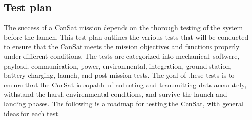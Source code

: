 \documentclass[11pt]{article}
\begin{document}
\subsection{Test plan}

The success of a CanSat mission depends on the thorough testing of the system before the launch. This test plan outlines the various tests that will be conducted to ensure that the CanSat meets the mission objectives and functions properly under different conditions. The tests are categorized into mechanical, software, payload, communication, power, environmental, integration, ground station, battery charging, launch, and post-mission tests. The goal of these tests is to ensure that the CanSat is capable of collecting and transmitting data accurately, withstand the harsh environmental conditions, and survive the launch and landing phases. The following is a roadmap for testing the CanSat, with general ideas for each test.
\end{document}
